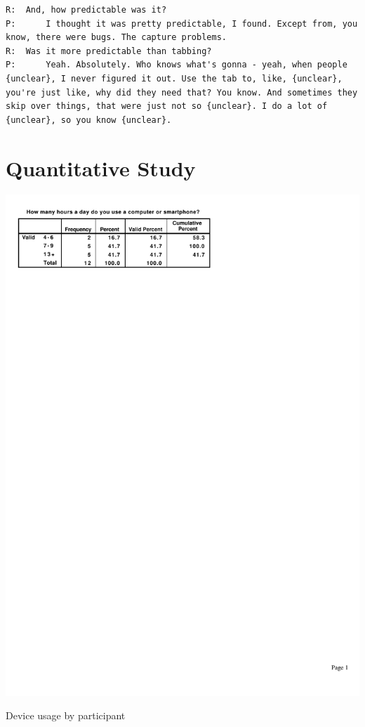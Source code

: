 \documentclass[a4paper, 12pt]{report}
\begin{document}
\begin{lstlisting}[caption={Transcript of Usability Study}, label={lst:usabilityTrans}, style=basic, language=custom, flexiblecolumns=true]
R:	And, how predictable was it?
P:		I thought it was pretty predictable, I found. Except from, you know, there were bugs. The capture problems.
R:	Was it more predictable than tabbing?
P:		Yeah. Absolutely. Who knows what's gonna - yeah, when people {unclear}, I never figured it out. Use the tab to, like, {unclear}, you're just like, why did they need that? You know. And sometimes they skip over things, that were just not so {unclear}. I do a lot of {unclear}, so you know {unclear}.
\end{lstlisting}
\FloatBarrier

\chapter{Quantitative Study}

\begin{table}[ht]
\centerline{\includegraphics{figures/ComputerHours.pdf}}
\caption{Device usage by participant}
\label{fig:partic_computerHours}
\end{table}
\end{document}

